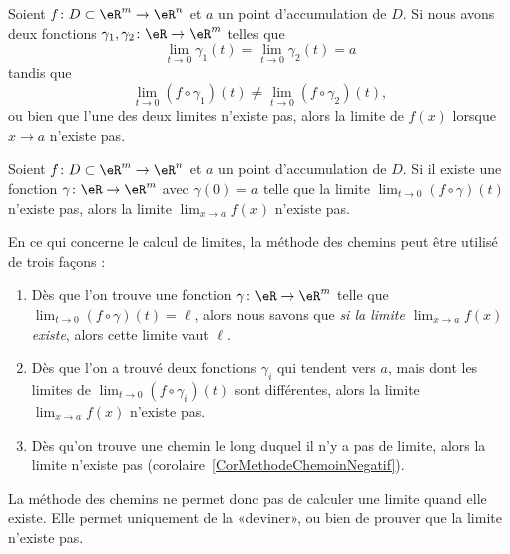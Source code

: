 \begin{corollary}	\label{CorMethodeChemin}
	Soient \( f\colon D\subset\eR^m\to \eR^n\) et \( a\) un point d'accumulation de \( D\). Si nous avons deux fonctions \( \gamma_1,\gamma_2\colon \eR\to \eR^m\) telles que
	\begin{equation}
		\lim_{t\to 0} \gamma_1(t)=\lim_{t\to 0} \gamma_2(t)=a
	\end{equation}
	tandis que
	\begin{equation}
		\lim_{t\to 0} (f\circ \gamma_1)(t)\neq\lim_{t\to 0} (f\circ \gamma_2)(t),
	\end{equation}
	ou bien que l'une des deux limites n'existe pas, alors la limite de \( f(x)\) lorsque \( x\to a\) n'existe pas.
\end{corollary}

\begin{corollary}	\label{CorMethodeChemoinNegatif}
	Soient \( f\colon D\subset\eR^m\to \eR^n\) et \( a\) un point d'accumulation de \( D\). Si il existe une fonction \( \gamma\colon \eR\to \eR^m\) avec \( \gamma(0)=a\) telle que la limite \( \lim_{t\to 0} (f\circ\gamma)(t)\) n'existe pas, alors la limite \( \lim_{x\to a} f(x)\) n'existe pas.
\end{corollary}

En ce qui concerne le calcul de limites, la méthode des chemins peut être utilisé de trois façons :
\begin{enumerate}
	\item
	      Dès que l'on trouve une fonction \( \gamma\colon \eR\to \eR^m\) telle que \( \lim_{t\to 0} (f\circ \gamma)(t)=\ell\), alors nous savons que \emph{si la limite \( \lim_{x\to a} f(x)\) existe}, alors cette limite vaut \( \ell\).
	\item
	      Dès que l'on a trouvé deux fonctions \( \gamma_i\) qui tendent vers \( a\), mais dont les limites de \( \lim_{t\to 0} (f\circ\gamma_i)(t)\) sont différentes, alors la limite \( \lim_{x\to a} f(x)\) n'existe pas.
	\item
	      Dès qu'on trouve une chemin le long duquel il n'y a pas de limite, alors la limite n'existe pas (corolaire~\ref{CorMethodeChemoinNegatif}).
\end{enumerate}
La méthode des chemins ne permet donc pas de calculer une limite quand elle existe. Elle permet uniquement de la «deviner», ou bien de prouver que la limite n'existe pas.

